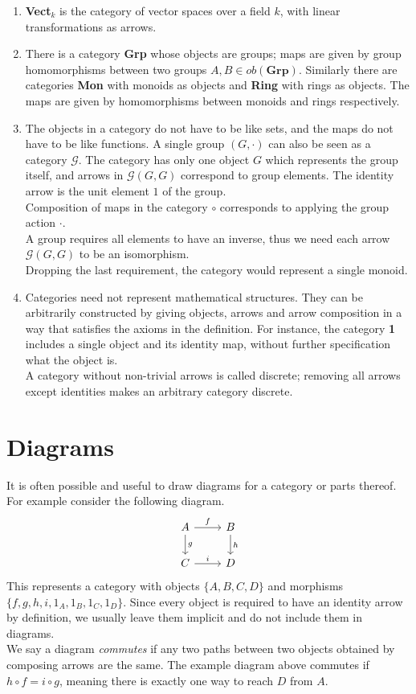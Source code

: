 \begin {enumerate}
  \item \textbf{Vect$_k$} is the category of vector spaces over a field $k$, with linear transformations as arrows.
  
  \item There is a category \textbf{Grp} whose objects are groups; maps are given by group homomorphisms between two groups $A,B \in ob(\textbf{Grp}).$
    Similarly there are categories \textbf{Mon} with monoids as objects and \textbf{Ring} with rings as objects.
    The maps are given by homomorphisms between monoids and rings respectively.
  
  \item
    The objects in a category do not have to be like sets, and the maps do not have to be like functions.
    A single group $(G, \cdot)$ can also be seen as a category $\mathcal{G}$. The category has only one object $G$ which represents the group itself,
    and arrows in $\mathcal{G}(G, G)$  correspond to group elements.
    The identity arrow is the unit element $1$ of the group.\\
    Composition of maps in the category $\circ$ corresponds to applying the group action $\cdot$.\\
    A group requires all elements to have an inverse, thus we need each arrow $\mathcal{G}(G, G)$ to be an isomorphism.\\
    Dropping the last requirement, the category would represent a single monoid.

  
  \item Categories need not represent mathematical structures. They can be arbitrarily constructed by giving objects, arrows and arrow composition in a way that satisfies the axioms in the definition. For instance, the category \textbf{1} includes a single object and its identity map, without further specification what the object is. \\
    A category without non-trivial arrows is called discrete; removing all arrows except identities makes an arbitrary category discrete.
 \end {enumerate}


\section {Diagrams}
It is often possible and useful to draw diagrams for a category or parts thereof.
For example consider the following diagram.
\[
  \begin{tikzcd}
    A \arrow{r}{f} \arrow{d}{g} & B \arrow{d}{h} \\
    C \arrow{r}{i}              & D 
  \end{tikzcd}
\]
This represents a category with objects $\{A, B, C, D\}$ and
morphisms $\{f, g, h, i, 1_A, 1_B, 1_C, 1_D \}$.
Since every object is required to have an identity arrow by definition,
we usually leave them implicit and do not include them in diagrams.\\
We say a diagram \emph{commutes} if any two paths between two objects
obtained by composing arrows are the same.
The example diagram above commutes if $ h \circ f = i \circ g $, meaning there is
exactly one way to reach $D$ from $A$.


